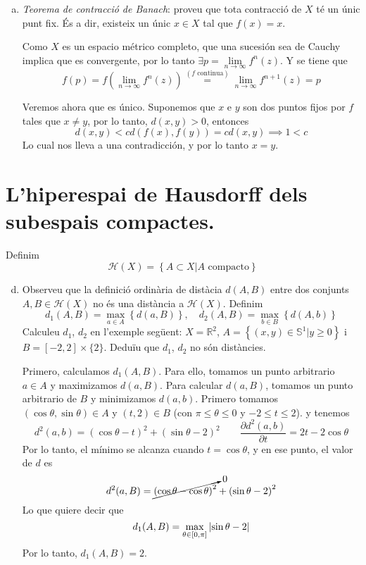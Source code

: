 \documentclass[12pt]{article}
\newcommand{\h}{\mathscr{H}}
\newcommand\setb[1]{\left\{#1\right\}}
\theoremstyle{break}
\begin{document}
{\begin{enumerate}[a)]
\item\label{item:teob} \emph{Teorema de contracció de Banach}: proveu que tota contracció de $X$ té un únic punt fix.
	És a dir, existeix un únic $x \in X$ tal que $f(x) = x$.

	Como $X$ es un espacio métrico completo, que una sucesión sea de Cauchy implica que es convergente,
	por lo tanto $\exists p = \lim\limits_{n \to \infty} f^n(z)$. Y se tiene que 
	\[
		f(p) = f\left( \lim_{n \to \infty} f^n(z) \right) \stackrel{(f \text{ continua})}{=} \lim_{n \to \infty} f^{n+1}(z) = p
	\]

	Veremos ahora que es único. Suponemos que $x$ e $y$ son dos puntos fijos por $f$ tales que $x \neq y$,
	por lo tanto, $d(x, y) > 0$, entonces
	\[
		d(x, y) < c d\left( f(x), f(y) \right) = c d(x, y) \implies 1 < c
	\]
	Lo cual nos lleva a una contradicción, y por lo tanto $x = y$.
\end{enumerate}

\section{L’hiperespai de Hausdorff dels subespais compactes.}
Definim
\[
	\h(X) = \setb{A \subset X \vert A \text{ compacto}}
\]

\begin{enumerate}[a)] \setcounter{enumi}{3}
\item Observeu que la definició ordinària de distàcia $d(A,B)$
	entre dos conjunts $A, B \in \h(X)$ no és una distància a
	$\h(X)$. Definim
	\[
		d_1(A, B) = \max_{a \in A} \setb{d(a, B)}, \quad d_2(A, B)
		= \max_{b \in B} \setb{d(A, b)}
	\]
	Calculeu $d_1$, $d_2$ en l'exemple següent: $X = \mathbb{R}^2$,
	$A = \setb{(x, y) \in \mathbb{S}^1 \vert y \geq 0}$ i
	$B = [-2, 2] \times \{2\}$. Deduïu que $d_1$, $d_2$ no són
	distàncies.


	Primero, calculamos $d_1(A, B)$. Para ello, tomamos un punto
	arbitrario $a \in A$ y maximizamos $d(a, B)$. Para calcular
	$d(a, B)$, tomamos un punto arbitrario de $B$ y minimizamos
	$d(a, b)$. Primero tomamos
	$(\cos \theta, \sin \theta) \in A$ y $(t, 2) \in B$ (con
	$\pi \leq \theta \leq 0$ y $-2 \leq t \leq 2$). y tenemos
	\[
		d^2(a, b) = \left( \cos \theta - t \right)^2 + \left( \sin
		\theta -2 \right)^2 \qquad \frac{\partial d^2(a,
		b)}{\partial t} = 2t - 2\cos \theta
	\]
	Por lo tanto, el mínimo se alcanza cuando $t = \cos \theta$,
	y en ese punto, el valor de $d$ es
	\[
		d^2(a, B) = \cancelto{0}{\left( \cos \theta - \cos \theta
		\right)^2} + \left( \sin \theta - 2 \right)^2
	\]
	Lo que quiere decir que
	\[
		d_1(A, B) = \max_{\theta \in [0, \pi]} \abs{\sin \theta -
		2}
	\]
	Por lo tanto, $d_1(A, B) = 2$.


\end{enumerate}}
\end{document}
